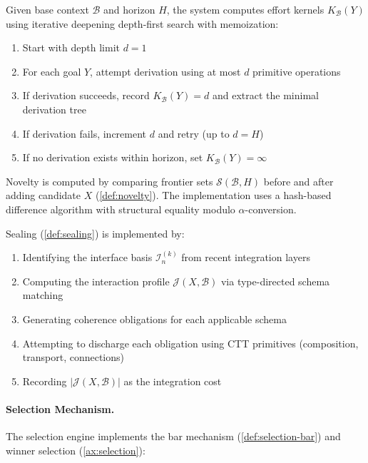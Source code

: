 \documentclass[11pt]{article}
\theoremstyle{definition}
\theoremstyle{remark}
\begin{document}
Given base context $\mathcal{B}$ and horizon $H$, the system computes effort kernels $K_{\mathcal{B}}(Y)$ using iterative deepening depth-first search with memoization:

\begin{enumerate}
\item Start with depth limit $d = 1$
\item For each goal $Y$, attempt derivation using at most $d$ primitive operations
\item If derivation succeeds, record $K_{\mathcal{B}}(Y) = d$ and extract the minimal derivation tree
\item If derivation fails, increment $d$ and retry (up to $d = H$)
\item If no derivation exists within horizon, set $K_{\mathcal{B}}(Y) = \infty$
\end{enumerate}

Novelty is computed by comparing frontier sets $\mathcal{S}(\mathcal{B}, H)$ before and after adding candidate $X$ (\cref{def:novelty}). The implementation uses a hash-based difference algorithm with structural equality modulo $\alpha$-conversion.

Sealing (\cref{def:sealing}) is implemented by:
\begin{enumerate}
\item Identifying the interface basis $\mathcal{I}_n^{(k)}$ from recent integration layers
\item Computing the interaction profile $\mathcal{J}(X, \mathcal{B})$ via type-directed schema matching
\item Generating coherence obligations for each applicable schema
\item Attempting to discharge each obligation using CTT primitives (composition, transport, connections)
\item Recording $|\mathcal{J}(X, \mathcal{B})|$ as the integration cost
\end{enumerate}

\paragraph{Selection Mechanism.}

The selection engine implements the bar mechanism (\cref{def:selection-bar}) and winner selection (\cref{ax:selection}):
\end{document}
